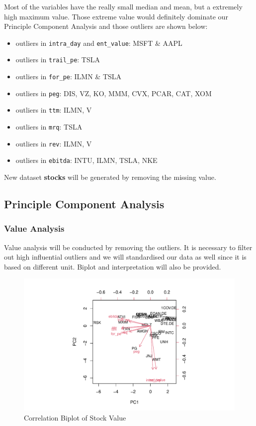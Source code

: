 \documentclass[11pt,a4paper,]{article}
\providecommand{\tightlist}{%
  \setlength{\itemsep}{0pt}\setlength{\parskip}{0pt}}
\begin{document}
Most of the variables have the really small median and mean, but a extremely high maximum value. Those extreme value would definitely dominate our Principle Component Analysis and those outliers are shown below:

\begin{itemize}
\tightlist
\item
  outliers in \texttt{intra\_day} and \texttt{ent\_value}: MSFT \& AAPL
\item
  outliers in \texttt{trail\_pe}: TSLA
\item
  outliers in \texttt{for\_pe}: ILMN \& TSLA
\item
  outliers in \texttt{peg}: DIS, VZ, KO, MMM, CVX, PCAR, CAT, XOM
\item
  outliers in \texttt{ttm}: ILMN, V
\item
  outliers in \texttt{mrq}: TSLA
\item
  outliers in \texttt{rev}: ILMN, V
\item
  outliers in \texttt{ebitda}: INTU, ILMN, TSLA, NKE
\end{itemize}

New dataset \textbf{stocks} will be generated by removing the missing value.

\hypertarget{principle-component-analysis}{%
\subsection{Principle Component Analysis}\label{principle-component-analysis}}

\hypertarget{value-analysis}{%
\subsubsection{Value Analysis}\label{value-analysis}}

Value analysis will be conducted by removing the outliers. It is necessary to filter out high influential outliers and we will standardised our data as well since it is based on different unit. Biplot and interpretation will also be provided.

\begin{figure}
\centering
\includegraphics{ass2_files/figure-latex/pca-cor-1.pdf}
\caption{\label{fig:pca-cor}Correlation Biplot of Stock Value}
\end{figure}
\end{document}
